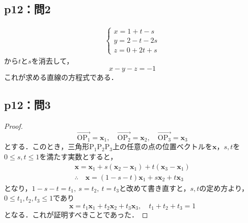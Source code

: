 \documentclass[uplatex,dvipdfmx,a4paper,10pt,fleqn]{jsarticle}
\begin{document}
\subsection*{p12：問2}

\begin{tleftbar}
    \begin{align*}
        \begin{cases}
            x=1+t-s \\
            y=2-t -2s \\
            z=0+2t+s
        \end{cases}
    \end{align*}
    から$t$と$s$を消去して，
    \[
        x-y-z=-1
    \]
    これが求める直線の方程式である．
\end{tleftbar}

\subsection*{p12：問3}

\begin{tleftbar}
    \begin{proof}
        \[
            \overrightarrow{\mathrm{OP_1}}=\bm{x}_1,\quad \overrightarrow{\mathrm{OP_2}}=\bm{x}_2,\quad \overrightarrow{\mathrm{OP_3}}=\bm{x}_3
        \]
        とする．このとき，三角形$\mathrm{P_1 P_2 P_3}$上の任意の点の位置ベクトルを$\bm{x}$，$s,t$を$0 \le s,t \le 1$を満たす実数とすると，
        \begin{gather*}
            \bm{x}=\bm{x}_1 + s(\bm{x}_2 - \bm{x}_1) + t (\bm{x}_3 - \bm{x}_1) \\
            \therefore \quad \bm{x} = (1-s-t)\bm{x}_1 + s\bm{x}_2 + t \bm{x}_3
        \end{gather*}
        となり，$1-s-t=t_1,~s=t_2,~t=t_3$と改めて書き直すと，$s,t$の定め方より，$0 \le t_1 ,t_2,t_3 \le 1$であり
        \[
            \bm{x} = t_1\bm{x}_1 + t_2\bm{x}_2 + t_3 \bm{x}_3,\quad t_1+t_2+t_3=1
        \]
        となる．これが証明すべきことであった．
    \end{proof}
\end{tleftbar}
%
\newpage
%
\end{document}
